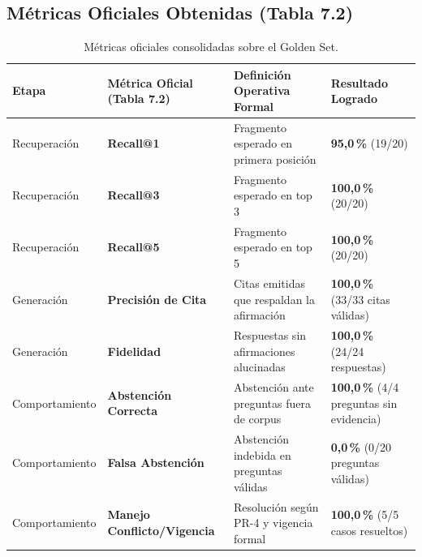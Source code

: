 \documentclass[11pt,letterpaper]{article}
\begin{document}
\subsection{Métricas Oficiales Obtenidas (Tabla 7.2)}
\begin{table}[h!]
\small\centering
\begin{tabularx}{\textwidth}{llXY}
\toprule
\textbf{Etapa} & \textbf{Métrica Oficial (Tabla 7.2)} & \textbf{Definición Operativa Formal} & \textbf{Resultado Logrado} \\
\midrule
Recuperación & \textbf{Recall@1} & Fragmento esperado en primera posición & \textbf{95,0\,\%} (19/20) \\
Recuperación & \textbf{Recall@3} & Fragmento esperado en top 3 & \textbf{100,0\,\%} (20/20) \\
Recuperación & \textbf{Recall@5} & Fragmento esperado en top 5 & \textbf{100,0\,\%} (20/20) \\
Generación & \textbf{Precisión de Cita} & Citas emitidas que respaldan la afirmación & \textbf{100,0\,\%} (33/33 citas válidas) \\
Generación & \textbf{Fidelidad} & Respuestas sin afirmaciones alucinadas & \textbf{100,0\,\%} (24/24 respuestas) \\
Comportamiento & \textbf{Abstención Correcta} & Abstención ante preguntas fuera de corpus & \textbf{100,0\,\%} (4/4 preguntas sin evidencia) \\
Comportamiento & \textbf{Falsa Abstención} & Abstención indebida en preguntas válidas & \textbf{0,0\,\%} (0/20 preguntas válidas) \\
Comportamiento & \textbf{Manejo Conflicto/Vigencia} & Resolución según PR-4 y vigencia formal & \textbf{100,0\,\%} (5/5 casos resueltos) \\
\bottomrule
\end{tabularx}
\caption{Métricas oficiales consolidadas sobre el Golden Set.}
\end{table}
\end{document}
